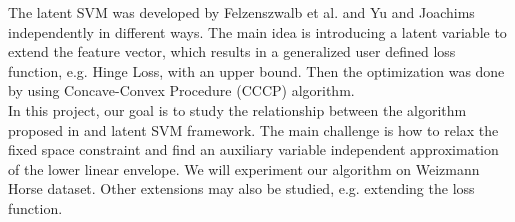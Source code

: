 \documentclass{article}
\begin{document}
	The latent SVM was developed by Felzenszwalb et al.\cite{felzenszwalb2008discriminatively} and Yu and Joachims\cite{yu2009learning} independently in different ways. The main idea is introducing a latent variable to extend the feature vector, which results in a generalized user defined loss function, e.g. Hinge Loss, with an upper bound. Then the optimization was done by using Concave-Convex Procedure (CCCP) algorithm.\\
	In this project, our goal is to study the relationship between the algorithm proposed in \cite{gouldlearning} and latent SVM framework. The main challenge is how to relax the fixed space constraint and find an auxiliary variable independent approximation of the lower linear envelope. We will experiment our algorithm on Weizmann Horse dataset\cite{borenstein2002class}\cite{borenstein2008combined}. Other extensions may also be studied, e.g. extending the loss function\cite{pletscher2012learning}.
\end{document}
